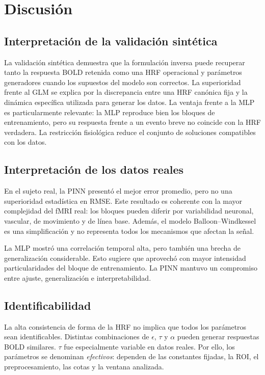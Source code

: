 \section{Discusión}

\subsection{Interpretación de la validación sintética}

La validación sintética demuestra que la formulación inversa puede recuperar tanto la respuesta BOLD retenida como una HRF operacional y parámetros generadores cuando los supuestos del modelo son correctos. La superioridad frente al GLM se explica por la discrepancia entre una HRF canónica fija y la dinámica específica utilizada para generar los datos. La ventaja frente a la MLP es particularmente relevante: la MLP reproduce bien los bloques de entrenamiento, pero su respuesta frente a un evento breve no coincide con la HRF verdadera. La restricción fisiológica reduce el conjunto de soluciones compatibles con los datos.

\subsection{Interpretación de los datos reales}

En el sujeto real, la PINN presentó el mejor error promedio, pero no una superioridad estadística en RMSE. Este resultado es coherente con la mayor complejidad del fMRI real: los bloques pueden diferir por variabilidad neuronal, vascular, de movimiento y de línea base. Además, el modelo Balloon--Windkessel es una simplificación y no representa todos los mecanismos que afectan la señal.

La MLP mostró una correlación temporal alta, pero también una brecha de generalización considerable. Esto sugiere que aprovechó con mayor intensidad particularidades del bloque de entrenamiento. La PINN mantuvo un compromiso entre ajuste, generalización e interpretabilidad.

\subsection{Identificabilidad}

La alta consistencia de forma de la HRF no implica que todos los parámetros sean identificables. Distintas combinaciones de $\epsilon$, $\tau$ y $\alpha$ pueden generar respuestas BOLD similares. $\tau$ fue especialmente variable en datos reales. Por ello, los parámetros se denominan \emph{efectivos}: dependen de las constantes fijadas, la ROI, el preprocesamiento, las cotas y la ventana analizada.


